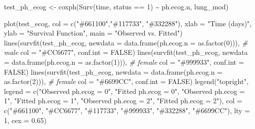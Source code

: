 \documentclass[
]{article}
\newenvironment{Shaded}{\begin{snugshade}}{\end{snugshade}}
\newcommand{\AttributeTok}[1]{\textcolor[rgb]{0.77,0.63,0.00}{#1}}
\newcommand{\CommentTok}[1]{\textcolor[rgb]{0.56,0.35,0.01}{\textit{#1}}}
\newcommand{\ConstantTok}[1]{\textcolor[rgb]{0.00,0.00,0.00}{#1}}
\newcommand{\DecValTok}[1]{\textcolor[rgb]{0.00,0.00,0.81}{#1}}
\newcommand{\FloatTok}[1]{\textcolor[rgb]{0.00,0.00,0.81}{#1}}
\newcommand{\FunctionTok}[1]{\textcolor[rgb]{0.00,0.00,0.00}{#1}}
\newcommand{\NormalTok}[1]{#1}
\newcommand{\OtherTok}[1]{\textcolor[rgb]{0.56,0.35,0.01}{#1}}
\newcommand{\SpecialCharTok}[1]{\textcolor[rgb]{0.00,0.00,0.00}{#1}}
\newcommand{\StringTok}[1]{\textcolor[rgb]{0.31,0.60,0.02}{#1}}
\begin{document}
\begin{Shaded}
\begin{Highlighting}[]
\NormalTok{test\_ph\_ecog }\OtherTok{\textless{}{-}} \FunctionTok{coxph}\NormalTok{(}\FunctionTok{Surv}\NormalTok{(time, status }\SpecialCharTok{==} \DecValTok{1}\NormalTok{) }\SpecialCharTok{\textasciitilde{}}\NormalTok{ ph.ecog.n, lung\_mod)}

\FunctionTok{plot}\NormalTok{(test\_ecog, }\AttributeTok{col =} \FunctionTok{c}\NormalTok{(}\StringTok{"\#661100"}\NormalTok{,}\StringTok{"\#117733"}\NormalTok{, }\StringTok{"\#332288"}\NormalTok{),}
     \AttributeTok{xlab =} \StringTok{"Time (days)"}\NormalTok{, }\AttributeTok{ylab =} \StringTok{"Survival Function"}\NormalTok{,}
     \AttributeTok{main =} \StringTok{"Observed vs. Fitted"}\NormalTok{)}
\FunctionTok{lines}\NormalTok{(}\FunctionTok{survfit}\NormalTok{(test\_ph\_ecog, }\AttributeTok{newdata =} \FunctionTok{data.frame}\NormalTok{(}\AttributeTok{ph.ecog.n =} \FunctionTok{as.factor}\NormalTok{(}\DecValTok{0}\NormalTok{))), }\CommentTok{\# male}
      \AttributeTok{col =} \StringTok{"\#CC6677"}\NormalTok{, }\AttributeTok{conf.int =} \ConstantTok{FALSE}\NormalTok{)}
\FunctionTok{lines}\NormalTok{(}\FunctionTok{survfit}\NormalTok{(test\_ph\_ecog, }\AttributeTok{newdata =} \FunctionTok{data.frame}\NormalTok{(}\AttributeTok{ph.ecog.n =} \FunctionTok{as.factor}\NormalTok{(}\DecValTok{1}\NormalTok{))), }\CommentTok{\# female}
      \AttributeTok{col =} \StringTok{"\#999933"}\NormalTok{, }\AttributeTok{conf.int =} \ConstantTok{FALSE}\NormalTok{)}
\FunctionTok{lines}\NormalTok{(}\FunctionTok{survfit}\NormalTok{(test\_ph\_ecog, }\AttributeTok{newdata =} \FunctionTok{data.frame}\NormalTok{(}\AttributeTok{ph.ecog.n =} \FunctionTok{as.factor}\NormalTok{(}\DecValTok{2}\NormalTok{))), }\CommentTok{\# female}
      \AttributeTok{col =} \StringTok{"\#6699CC"}\NormalTok{, }\AttributeTok{conf.int =} \ConstantTok{FALSE}\NormalTok{)}
\FunctionTok{legend}\NormalTok{(}\StringTok{"topright"}\NormalTok{, }\AttributeTok{legend =} \FunctionTok{c}\NormalTok{(}\StringTok{"Observed ph.ecog = 0"}\NormalTok{, }\StringTok{"Fitted ph.ecog = 0"}\NormalTok{,}
                              \StringTok{"Observed ph.ecog = 1"}\NormalTok{, }\StringTok{"Fitted ph.ecog = 1"}\NormalTok{,}
                              \StringTok{"Observed ph.ecog = 2"}\NormalTok{, }\StringTok{"Fitted ph.ecog = 2"}\NormalTok{), }
       \AttributeTok{col =} \FunctionTok{c}\NormalTok{(}\StringTok{"\#661100"}\NormalTok{, }\StringTok{"\#CC6677"}\NormalTok{, }\StringTok{"\#117733"}\NormalTok{, }\StringTok{"\#999933"}\NormalTok{, }\StringTok{"\#332288"}\NormalTok{, }\StringTok{"\#6699CC"}\NormalTok{), }\AttributeTok{lty =} \DecValTok{1}\NormalTok{, }\AttributeTok{cex =} \FloatTok{0.65}\NormalTok{)}
\end{Highlighting}
\end{Shaded}
\end{document}
